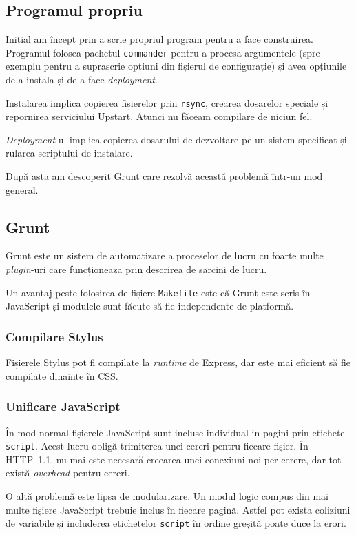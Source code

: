 \documentclass[a4wide,12pt]{report}
\newcommand{\eng}[1]{\emph{#1}} %
\newcommand{\cod}[1]{\texttt{#1}}
\begin{document}
\subsection{Programul propriu}

Inițial am încept prin a scrie propriul program pentru a face construirea.
Programul folosea pachetul \cod{commander} pentru a procesa argumentele (spre
exemplu pentru a suprascrie opțiuni din fișierul de configurație) și avea
opțiunile de a instala și de a face \eng{deployment}.

Instalarea implica copierea fișierelor prin \cod{rsync}, crearea dosarelor
speciale și repornirea serviciului Upstart. Atunci nu făceam compilare de niciun
fel.

\eng{Deployment}-ul implica copierea dosarului de dezvoltare pe un sistem
specificat și rularea scriptului de instalare.

După asta am descoperit Grunt care rezolvă această problemă într-un mod general.

\subsection{Grunt}

Grunt este un sistem de automatizare a proceselor de lucru cu foarte multe
\eng{plugin}-uri care funcționeaza prin descrirea de sarcini de lucru.

Un avantaj peste folosirea de fișiere \cod{Makefile} este că Grunt este scris în
JavaScript și modulele sunt făcute să fie independente de platformă.

\subsubsection{Compilare Stylus}

Fișierele Stylus pot fi compilate la \eng{runtime} de Express, dar este mai
eficient să fie compilate dinainte în CSS.

\subsubsection{Unificare JavaScript}

În mod normal fișierele JavaScript sunt incluse individual in pagini prin
etichete \cod{script}. Acest lucru obligă trimiterea unei cereri pentru fiecare
fișier. În HTTP~1.1, nu mai este necesară creearea unei conexiuni noi per
cerere, dar tot există \eng{overhead} pentru cereri.

O altă problemă este lipsa de modularizare. Un modul logic compus din mai multe
fișiere JavaScript trebuie inclus în fiecare pagină. Astfel pot exista coliziuni
de variabile și includerea etichetelor \cod{script} în ordine greșită poate duce
la erori.
\end{document}
